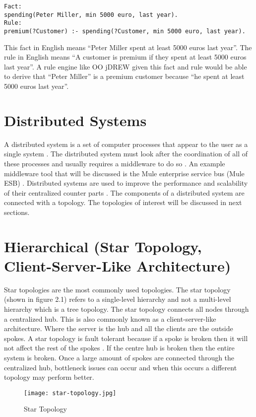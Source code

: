 \documentclass[12pt]{report}
\begin{document}
\begin{verbatim}
Fact:
spending(Peter Miller, min 5000 euro, last year).
Rule:
premium(?Customer) :- spending(?Customer, min 5000 euro, last year).
\end{verbatim}

This fact in English means ``Peter Miller spent at least 5000 euros last year''.  The rule in English means ``A customer is premium if they spent at least 5000 euros last year''.  A rule engine like OO jDREW given this fact and rule would be able to derive that ``Peter Miller'' is a premium customer because ``he spent at least 5000 euros last year''.

\section{Distributed Systems}	
A distributed system is a set of computer processes that appear to the user as a single system \cite{DS}.  The distributed system must look after the coordination of all of these processes and usually requires a middleware to do so \cite{googleDS}. An example middleware tool that will be discussed is the Mule enterprise service bus (Mule ESB)  \cite{MULE}.  Distributed systems are used to improve the performance and scalability of their centralized counter parts \cite{googleDS}.  The components of a distributed system are connected with a topology.  The topologies of interest will be discussed in next sections.  
	
\section{Hierarchical (Star Topology, Client-Server-Like Architecture)}	
Star topologies are the most commonly used topologies.  The star topology (shown in figure 2.1) refers to a single-level hierarchy and not a multi-level hierarchy which is a tree topology. The star topology connects all nodes through a centralized hub.  This is also commonly known as a client-server-like architecture.  Where the server is the hub and all the clients are the outside spokes.  A star topology is fault tolerant because if a spoke is broken then it will not affect the rest of the spokes \cite{Topology}.  If the centre hub is broken then the entire system is broken.  Once a large amount of spokes are connected through the centralized hub, bottleneck issues can occur and when this occurs a different topology may perform better.
\begin{figure}[ht]
\centering
\texttt{[image: star-topology.jpg]}
\caption{Star Topology}\label{fig:1}
\end{figure}
\end{document}
